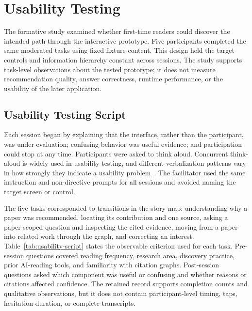 \section{Usability Testing}
\label{sec:usability-testing}

The formative study examined whether first-time readers could discover the intended path through the interactive prototype. Five participants completed the same moderated tasks using fixed fixture content. This design held the target controls and information hierarchy constant across sessions. The study supports task-level observations about the tested prototype; it does not measure recommendation quality, answer correctness, runtime performance, or the usability of the later application.

\subsection{Usability Testing Script}
\label{subsec:usability-script}

Each session began by explaining that the interface, rather than the participant, was under evaluation; confusing behavior was useful evidence; and participation could stop at any time. Participants were asked to think aloud. Concurrent think-aloud is widely used in usability testing, and different verbalization patterns vary in how strongly they indicate a usability problem~\cite{fan2019thinkaloud}. The facilitator used the same instruction and non-directive prompts for all sessions and avoided naming the target screen or control.

The five tasks corresponded to transitions in the story map: understanding why a paper was recommended, locating its contribution and one source, asking a paper-scoped question and inspecting the cited evidence, moving from a paper into related work through the graph, and correcting an interest. Table~\ref{tab:usability-script} states the observable criterion used for each task. Pre-session questions covered reading frequency, research area, discovery practice, prior AI-reading tools, and familiarity with citation graphs. Post-session questions asked which component was useful or confusing and whether reasons or citations affected confidence. The retained record supports completion counts and qualitative observations, but it does not contain participant-level timing, taps, hesitation duration, or complete transcripts.


